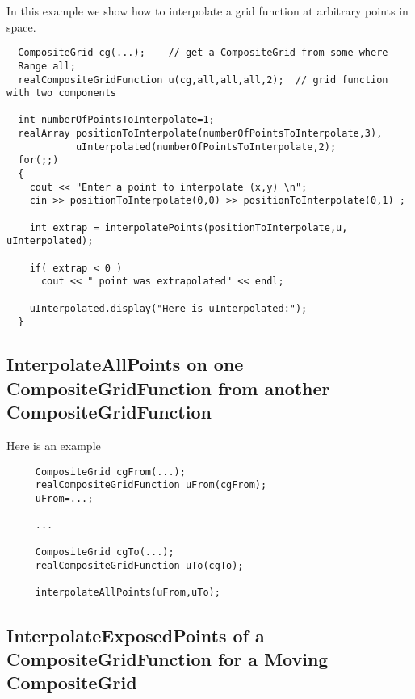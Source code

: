 



In this example we show how to interpolate a grid function at arbitrary points in space.
\begin{verbatim}
  CompositeGrid cg(...);    // get a CompositeGrid from some-where
  Range all;
  realCompositeGridFunction u(cg,all,all,all,2);  // grid function with two components

  int numberOfPointsToInterpolate=1;
  realArray positionToInterpolate(numberOfPointsToInterpolate,3), 
            uInterpolated(numberOfPointsToInterpolate,2);
  for(;;)
  {
    cout << "Enter a point to interpolate (x,y) \n";
    cin >> positionToInterpolate(0,0) >> positionToInterpolate(0,1) ;

    int extrap = interpolatePoints(positionToInterpolate,u, uInterpolated);

    if( extrap < 0 )
      cout << " point was extrapolated" << endl;

    uInterpolated.display("Here is uInterpolated:");
  }
\end{verbatim}





\subsection{InterpolateAllPoints on one CompositeGridFunction from another CompositeGridFunction}



 Here is an example
\begin{verbatim}
     CompositeGrid cgFrom(...); 
     realCompositeGridFunction uFrom(cgFrom);   
     uFrom=...;

     ...

     CompositeGrid cgTo(...);
     realCompositeGridFunction uTo(cgTo);   

     interpolateAllPoints(uFrom,uTo);        

\end{verbatim}



\subsection{InterpolateExposedPoints of a CompositeGridFunction for a Moving CompositeGrid}





